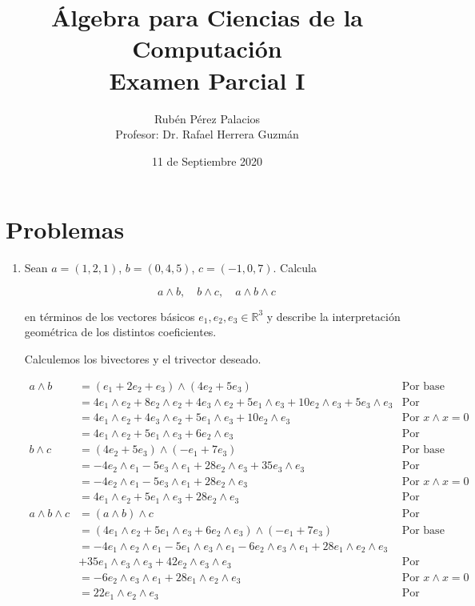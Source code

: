 \documentclass[letterpaper]{article}
\title{Álgebra para Ciencias de la Computación\\Examen Parcial I}
\author{Rubén Pérez Palacios\\Profesor: Dr. Rafael Herrera Guzmán}
\date{11 de Septiembre 2020}
\theoremstyle{definition}
\theoremstyle{lemathm}
\theoremstyle{lemademthm}
\newcommand{\R}{\mathbb{R}}
\begin{document}
	\maketitle
    
    \section*{Problemas}

    \begin{enumerate}
		
		\item Sean $a=(1,2,1)$, $b=(0,4,5)$, $c=(-1,0,7)$. Calcula
		
		\[a \wedge b, \quad b \wedge c, \quad a \wedge b \wedge c\]

		en términos de los vectores básicos $e_1,e_2,e_3 \in \R^3$ y describe la interpretación geométrica de los distintos coeficientes.

		Calculemos los bivectores y el trivector deseado.

		\begin{align*}
			a \wedge b &= (e_1 + 2e_2 + e_3) \wedge (4e_2 + 5e_3) & \text{Por base canónica}\\
			&= 4 e_1 \wedge e_2 + 8 e_2 \wedge e_2 + 4 e_3 \wedge e_2 + 5 e_1 \wedge e_3 + 10 e_2 \wedge e_3 + 5 e_3 \wedge e_3 & \text{Por distribución}\\
			&= 4 e_1 \wedge e_2 + 4 e_3 \wedge e_2 + 5 e_1 \wedge e_3 + 10 e_2 \wedge e_3 & \text{Por $x \wedge x = 0$}\\
			&= 4 e_1 \wedge e_2 + 5 e_1 \wedge e_3 + 6 e_2 \wedge e_3 & \text{Por antisimetría}\\
			b \wedge c &= (4e_2 + 5e_3) \wedge (-e_1 + 7e_3) & \text{Por base canónica}\\
			&= -4 e_2 \wedge e_1 - 5 e_3 \wedge e_1 + 28 e_2 \wedge e_3 + 35 e_3 \wedge e_3 & \text{Por distribución}\\
			&= -4 e_2 \wedge e_1 - 5 e_3 \wedge e_1 + 28 e_2 \wedge e_3 & \text{Por $x \wedge x = 0$}\\
			&= 4 e_1 \wedge e_2 + 5 e_1 \wedge e_3 + 28 e_2 \wedge e_3 & \text{Por antisimetría}\\
			a \wedge b \wedge c &= (a \wedge b) \wedge c & \text{Por asociatividad}\\
			&= (4 e_1 \wedge e_2 + 5 e_1 \wedge e_3 + 6 e_2 \wedge e_3) \wedge (-e_1 + 7e_3) & \text{Por base canónica}\\
			&= -4 e_1 \wedge e_2 \wedge e_1 - 5 e_1 \wedge e_3 \wedge e_1 - 6 e_2 \wedge e_3 \wedge e_1 + 28 e_1 \wedge e_2 \wedge e_3\\
			& + 35 e_1 \wedge e_3 \wedge e_3 + 42 e_2 \wedge e_3 \wedge e_3 & \text{Por distribución}\\
			&= - 6 e_2 \wedge e_3 \wedge e_1 + 28 e_1 \wedge e_2 \wedge e_3 & \text{Por $x \wedge x = 0$}\\
			&= 22 e_1 \wedge e_2 \wedge e_3 & \text{Por antisimetría}\\
		\end{align*}


\end{enumerate}
\end{document}
